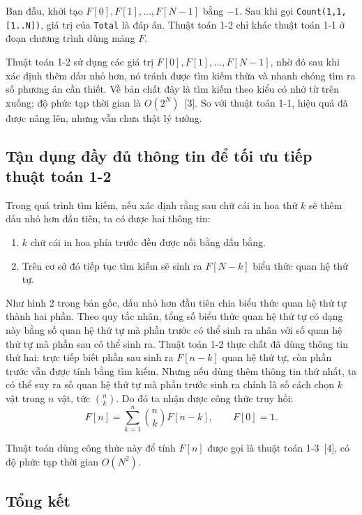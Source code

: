 \documentclass[11pt]{article}
\begin{document}
Ban đầu, khởi tạo \(F[0],F[1],\ldots,F[N-1]\) bằng \(-1\). Sau khi gọi
\verb|Count(1,1,[1..N])|, giá trị của \verb|Total| là đáp án. Thuật toán 1-2
chỉ khác thuật toán 1-1 ở đoạn chương trình dùng mảng \(F\).

Thuật toán 1-2 sử dụng các giá trị \(F[0],F[1],\ldots,F[N-1]\), nhờ đó sau
khi xác định thêm dấu nhỏ hơn, nó tránh được tìm kiếm thừa và nhanh chóng tìm
ra số phương án cần thiết. Về bản chất đây là tìm kiếm theo kiểu có nhớ từ
trên xuống; độ phức tạp thời gian là \(O(2^N)\)~[3]. So với thuật toán 1-1,
hiệu quả đã được nâng lên, nhưng vẫn chưa thật lý tưởng.

\subsection{Tận dụng đầy đủ thông tin để tối ưu tiếp thuật toán 1-2}

Trong quá trình tìm kiếm, nếu xác định rằng sau chữ cái in hoa thứ \(k\) sẽ
thêm dấu nhỏ hơn đầu tiên, ta có được hai thông tin:

\begin{enumerate}
  \item \(k\) chữ cái in hoa phía trước đều được nối bằng dấu bằng.
  \item Trên cơ sở đó tiếp tục tìm kiếm sẽ sinh ra \(F[N-k]\) biểu thức quan
  hệ thứ tự.
\end{enumerate}

Như hình 2 trong bản gốc, dấu nhỏ hơn đầu tiên chia biểu thức quan hệ thứ tự
thành hai phần. Theo quy tắc nhân, tổng số biểu thức quan hệ thứ tự có dạng
này bằng số quan hệ thứ tự mà phần trước có thể sinh ra nhân với số quan hệ
thứ tự mà phần sau có thể sinh ra. Thuật toán 1-2 thực chất đã dùng thông tin
thứ hai: trực tiếp biết phần sau sinh ra \(F[n-k]\) quan hệ thứ tự, còn phần
trước vẫn được tính bằng tìm kiếm. Nhưng nếu dùng thêm thông tin thứ nhất, ta
có thể suy ra số quan hệ thứ tự mà phần trước sinh ra chính là số cách chọn
\(k\) vật trong \(n\) vật, tức \(\binom{n}{k}\). Do đó ta nhận được công thức
truy hồi:
\[
  F[n] = \sum_{k=1}^{n} \binom{n}{k} F[n-k], \qquad F[0]=1.
\]

Thuật toán dùng công thức này để tính \(F[n]\) được gọi là thuật toán
1-3~[4], có độ phức tạp thời gian \(O(N^2)\).

\subsection{Tổng kết}
\end{document}

